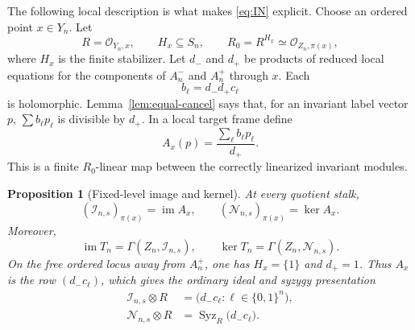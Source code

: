\documentclass[11pt,reqno]{amsart}
\newtheorem{proposition}[theorem]{Proposition}
\theoremstyle{definition}
\theoremstyle{remark}
\newcommand{\cO}{\mathcal O}
\newcommand{\im}{\operatorname{im}}
\newcommand{\Syz}{\operatorname{Syz}}
\begin{document}
The following local description is what makes \eqref{eq:IN} explicit.
Choose an ordered point $x\in Y_n$.  Let
\begin{equation}
 R=\cO_{Y_n,x},
 \qquad H_x\subseteq S_n,
 \qquad R_0=R^{H_x}\simeq\cO_{Z_n,\pi(x)},
 \label{eq:local-rings}
\end{equation}
where $H_x$ is the finite stabilizer.  Let $d_-$ and $d_+$ be products of
reduced local equations for the components of $A_n^-$ and $A_n^+$ through
$x$.  Each
\begin{equation}
 b_{\boldsymbol\ell}=d_-d_+c_{\boldsymbol\ell}
 \label{eq:b-row}
\end{equation}
is holomorphic.  Lemma~\ref{lem:equal-cancel} says that, for an invariant
label vector $p$, $\sum b_{\boldsymbol\ell}p_{\boldsymbol\ell}$ is divisible
by $d_+$.  In a local target frame define
\begin{equation}
 A_x(p)=
 \frac{\sum_{\boldsymbol\ell}b_{\boldsymbol\ell}
 p_{\boldsymbol\ell}}{d_+}.
 \label{eq:Ax}
\end{equation}
This is a finite $R_0$-linear map between the correctly linearized invariant
modules.

\begin{proposition}[Fixed-level image and kernel]
\label{prop:fixed-level}
At every quotient stalk,
\begin{equation}
 (\mathscr I_{n,s})_{\pi(x)}=\im A_x,
 \qquad
 (\mathscr N_{n,s})_{\pi(x)}=\ker A_x.
 \label{eq:fixed-stalks}
\end{equation}
Moreover,
\begin{equation}
 \im T_n=\Gamma(Z_n,\mathscr I_{n,s}),
 \qquad
 \ker T_n=\Gamma(Z_n,\mathscr N_{n,s}).
 \label{eq:fixed-global}
\end{equation}
On the free ordered locus away from $A_n^+$, one has $H_x=\{1\}$ and
$d_+=1$.  Thus $A_x$ is the row $(d_-c_{\boldsymbol\ell})$, which gives the
ordinary ideal and syzygy presentation
\begin{align}
 \mathscr I_{n,s}\otimes R
  &=\bigl(d_-c_{\boldsymbol\ell}:\boldsymbol\ell\in\{0,1\}^n\bigr),
 \label{eq:ideal-free}\\
 \mathscr N_{n,s}\otimes R
  &=\Syz_R\bigl(d_-c_{\boldsymbol\ell}\bigr).
 \label{eq:syzygy-free}
\end{align}
\end{proposition}
\end{document}
